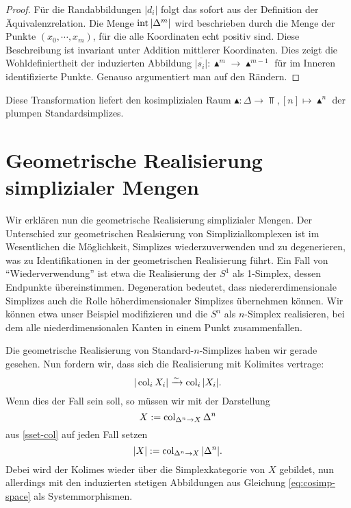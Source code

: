 \begin{proof}
  Für die Randabbildungen $|d_i|$ folgt das sofort aus der Definition
  der Äquivalenzrelation. Die Menge $\operatorname{int} |\Delta^m|$ wird
  beschrieben durch die Menge der Punkte $(x_0, \cdots, x_m)$, für die
  alle Koordinaten echt positiv sind. Diese Beschreibung ist invariant
  unter Addition mittlerer Koordinaten. Dies zeigt die
  Wohldefiniertheit der induzierten Abbildung $\overline{|s_i|}:
  \blacktriangle^m \to \blacktriangle^{m-1}$ für im Inneren
  identifizierte Punkte. Genauso argumentiert man auf den Rändern.
\end{proof}
Diese Transformation liefert den kosimplizialen Raum $\blacktriangle:
\Delta \to \Top, [n] \mapsto \blacktriangle^n$ der plumpen
Standardsimplizes.

\section{Geometrische Realisierung simplizialer Mengen}

Wir erklären nun die geometrische Realisierung simplizialer
Mengen. Der Unterschied zur geometrischen Realsierung von
Simplizialkomplexen ist im Wesentlichen die Möglichkeit, Simplizes
wiederzuverwenden und zu degenerieren, was zu Identifikationen in der
geometrischen Realisierung führt. Ein Fall von ``Wiederverwendung''
ist etwa die Realisierung der $S^1$ als 1-Simplex, dessen Endpunkte
übereinstimmen. Degeneration bedeutet, dass niedererdimensionale
Simplizes auch die Rolle höherdimensionaler Simplizes übernehmen
können. Wir können etwa unser Beispiel modifizieren und die $S^n$ als
$n$-Simplex realisieren, bei dem alle niederdimensionalen Kanten in
einem Punkt zusammenfallen.

Die geometrische Realisierung von Standard-$n$-Simplizes haben wir
gerade gesehen. Nun fordern wir, dass sich die Realisierung mit
Kolimites vertrage:
\begin{equation} \label{eq:real-cocont}
|\operatorname{col}_i X_i| \xrightarrow[]{\sim} \operatorname{col}_i |X_i|.
\end{equation}
Wenn dies der Fall sein soll, so müssen wir mit der Darstellung
\[ X := \operatorname{col}_{\Delta^n \to X} \Delta^n \]
aus \ref{sset-col} auf jeden Fall setzen
\begin{equation} \label{eq:real-colim}
|X| := \operatorname{col}_{\Delta^n \to X} |\Delta^n|.
\end{equation}
Debei wird der Kolimes wieder über die Simplexkategorie von $X$
gebildet, nun allerdings mit den induzierten stetigen Abbildungen aus
Gleichung \ref{eq:cosimp-space} als Systemmorphismen.

